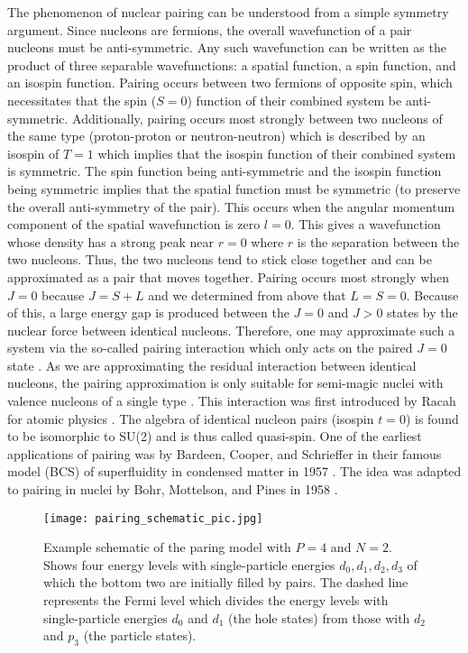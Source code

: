 \documentclass[Dual]{msu-thesis}
\begin{document}
The phenomenon of nuclear pairing can be understood from a simple symmetry argument. Since nucleons are fermions, the overall wavefunction of a pair nucleons must be anti-symmetric. Any such wavefunction can be written as the product of three separable wavefunctions: a spatial function, a spin function, and an isospin function. Pairing occurs between two fermions of opposite spin, which necessitates that the spin ($S=0$) function of their combined system be anti-symmetric. Additionally, pairing occurs most strongly between two nucleons of the same type (proton-proton or neutron-neutron) which is described by an isospin of $T=1$ which implies that the isospin function of their combined system is symmetric. The spin function being anti-symmetric and the isospin function being symmetric implies that the spatial function must be symmetric (to preserve the overall anti-symmetry of the pair). This occurs when the angular momentum component of the spatial wavefunction is zero $l=0$. This gives a wavefunction whose density has a strong peak near $r=0$ where $r$ is the separation between the two nucleons. Thus, the two nucleons tend to stick close together and can be approximated as a pair that moves together. Pairing occurs most strongly when $J=0$ because $J=S+L$ and we determined from above that $L=S=0$. Because of this, a large energy gap is produced between the $J=0$ and $J>0$ states by the nuclear force between identical nucleons. Therefore, one may approximate such a system via the so-called pairing interaction which only acts on the paired $J=0$ state \cite{ref:dean}. As we are approximating the residual interaction between identical nucleons, the pairing approximation is only suitable for semi-magic nuclei with valence nucleons of a single type \cite{ref:scholar}. This interaction was first introduced by Racah for atomic physics \cite{ref:racah}. The algebra of identical nucleon pairs (isospin $t=0$) is found to be isomorphic to SU(2) and is thus called quasi-spin. One of the earliest applications of pairing was by Bardeen, Cooper, and Schrieffer in their famous model (BCS) of superfluidity in condensed matter in 1957 \cite{ref:bcs}. The idea was adapted to pairing in nuclei by Bohr, Mottelson, and Pines in 1958 \cite{ref:bmp}.

\begin{figure}
    \centering
    \texttt{[image: pairing\_schematic\_pic.jpg]}
    \caption{Example schematic of the paring model with $P=4$ and $N=2$. Shows four energy levels with single-particle energies $d_0,d_1,d_2,d_3$ of which the bottom two are initially filled by pairs. The dashed line represents the Fermi level which divides the energy levels with single-particle energies $d_0$ and $d_1$ (the hole states) from those with $d_2$ and $p_3$ (the particle states).}
    \label{fig:pairing_schem}
\end{figure}
\end{document}
